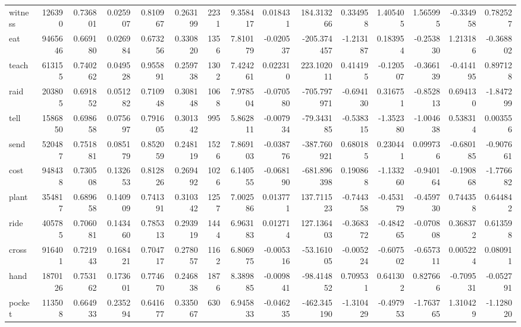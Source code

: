 \begin{tabular}{lrrrrrrrrrrrrrr}
witness   &    126390 &  0.736801 &      0.025907 &    0.810967 &  0.263199 &  2231 &  9.358417 &  0.018431 &  184.313266 &  0.334958 &  1.405405 &  1.565995 &     -0.334958 &         0.782527 \\
eat       &   9465646 &  0.669180 &      0.026984 &    0.673256 &  0.330820 &  1356 &  7.810179 & -0.020537 & -205.374457 & -1.213187 &  0.183954 & -0.253830 &      1.213186 &        -0.368802 \\
teach     &    613155 &  0.740262 &      0.049528 &    0.955891 &  0.259738 &  1302 &  7.424261 &  0.022310 &  223.102011 &  0.414195 & -0.120507 & -0.366139 &     -0.414195 &         0.897128 \\
raid      &    203805 &  0.691852 &      0.051282 &    0.710948 &  0.308148 &  1068 &  7.978504 & -0.070580 & -705.797971 & -0.694130 &  0.316751 & -0.852813 &      0.694130 &        -1.847299 \\
tell      &   1586850 &  0.698658 &      0.075697 &    0.791605 &  0.301342 &   995 &  5.862811 & -0.007934 &  -79.343185 & -0.538315 & -1.352380 & -1.004638 &      0.538314 &         0.003556 \\
send      &    520487 &  0.751881 &      0.085179 &    0.852059 &  0.248119 &  1526 &  7.869103 & -0.038776 & -387.760921 &  0.680185 &  0.230441 &  0.099736 &     -0.680185 &        -0.907661 \\
cost      &    948438 &  0.730508 &      0.132653 &    0.812826 &  0.269492 &  1026 &  6.140555 & -0.068190 & -681.896398 &  0.190868 & -1.133260 & -0.940164 &     -0.190868 &        -1.776682 \\
plant     &    354817 &  0.689658 &      0.140909 &    0.741391 &  0.310342 &  1257 &  7.002586 &  0.013771 &  137.711523 & -0.744358 & -0.453179 & -0.459730 &      0.744358 &         0.644842 \\
ride      &    405785 &  0.706081 &      0.143460 &    0.785313 &  0.293919 &  1444 &  6.963183 &  0.012714 &  127.136403 & -0.368372 & -0.484265 & -0.070808 &      0.368372 &         0.613598 \\
cross     &    916401 &  0.721943 &      0.168421 &    0.704717 &  0.278057 &  1162 &  6.806975 & -0.005316 &  -53.161005 & -0.005224 & -0.607502 & -0.657311 &      0.005224 &         0.080911 \\
hand      &   1870126 &  0.753162 &      0.173601 &    0.774670 &  0.246838 &  1876 &  8.389885 & -0.009841 &  -98.414852 &  0.709531 &  0.641302 &  0.827666 &     -0.709531 &        -0.052791 \\
pocket    &    113508 &  0.664933 &      0.235294 &    0.641677 &  0.335067 &   630 &  6.945833 & -0.046235 & -462.345190 & -1.310429 & -0.497953 & -1.763765 &      1.310429 &        -1.128020 \\

\end{tabular}
